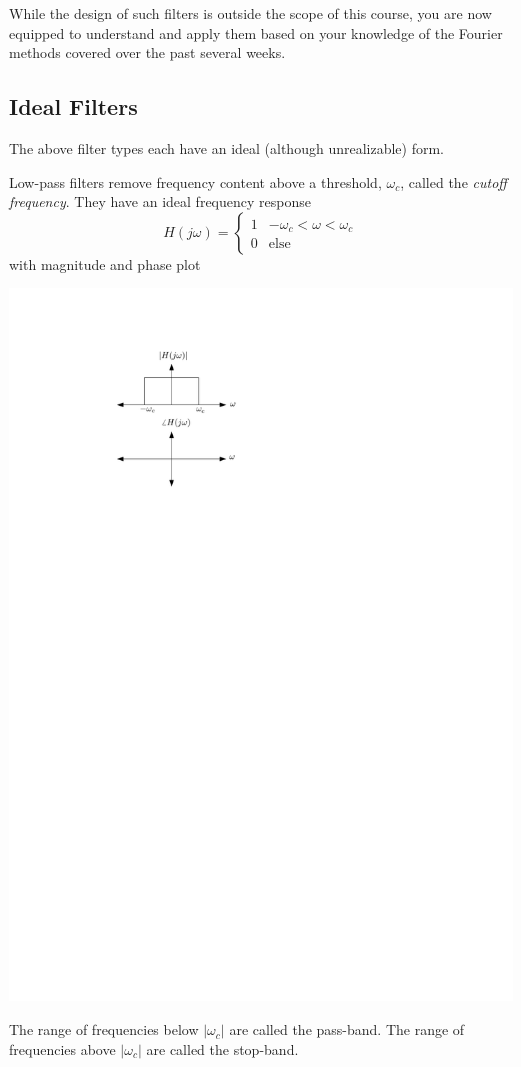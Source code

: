 While the design of such filters is outside the scope of this course, you are now equipped to understand and apply them based on your knowledge of the Fourier methods covered over the past several weeks.

\subsection{Ideal Filters}

The above filter types each have an ideal (although unrealizable) form.

Low-pass filters remove frequency content above a threshold, $\omega_c$, called the \emph{cutoff frequency}. They have an ideal frequency response
\[
H(j\omega) = \left\{ \begin{array}{lc}
  1 & -\omega_c < \omega < \omega_c\\
  0 & \text{else}
\end{array}
\right. 
\]
with magnitude and phase plot
\begin{center}
  \includegraphics[scale=1]{graphics/lowpass-ideal.pdf}
\end{center}
The range of frequencies below $|\omega_c|$ are called the pass-band. The range of frequencies above $|\omega_c|$ are called the stop-band.

